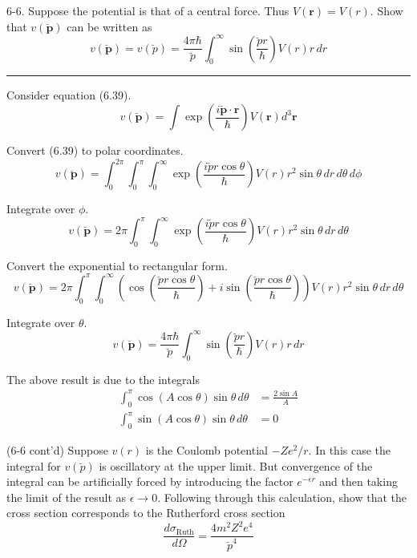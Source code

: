 \documentclass[12pt]{article}
\begin{document}
6-6.
Suppose the potential is that of a central force.
Thus $V(\mathbf r)=V(r)$.
Show that $v(\breve{\mathbf p})$ can be written as
\begin{equation*}
v(\breve{\mathbf p})=v(\breve p)=\frac{4\pi\hbar}{\breve p}
\int_0^\infty\sin\left(\frac{\breve pr}{\hbar}\right)V(r)r\,dr
\tag{6.45}
\end{equation*}

\bigskip
\hrule

\bigskip
Consider equation (6.39).
\begin{equation*}
v(\breve{\mathbf p})=\int\exp\left(\frac{i\breve{\mathbf p}\cdot\mathbf r}{\hbar}\right)
V(\mathbf r)d^3\mathbf r
\tag{6.39}
\end{equation*}

Convert (6.39) to polar coordinates.
\begin{equation*}
v(\breve{\mathbf p})=\int_0^{2\pi}\int_0^\pi\int_0^\infty
\exp\left(\frac{i\breve pr\cos\theta}{\hbar}\right)
V(r)r^2\sin\theta\,dr\,d\theta\,d\phi
\end{equation*}

Integrate over $\phi$.
\begin{equation*}
v(\breve{\mathbf p})=2\pi\int_0^\pi\int_0^\infty
\exp\left(\frac{i\breve pr\cos\theta}{\hbar}\right)
V(r)r^2\sin\theta\,dr\,d\theta
\end{equation*}

Convert the exponential to rectangular form.
\begin{equation*}
v(\breve{\mathbf p})=2\pi\int_0^\pi\int_0^\infty
\left(\cos\left(\frac{\breve pr\cos\theta}{\hbar}\right)
+i\sin\left(\frac{\breve pr\cos\theta}{\hbar}\right)\right)
V(r)r^2\sin\theta\,dr\,d\theta
\end{equation*}

Integrate over $\theta$.
\begin{equation*}
v(\breve{\mathbf p})=\frac{4\pi\hbar}{\breve p}\int_0^\infty
\sin\left(\frac{\breve pr}{\hbar}\right)
V(r)r\,dr
\end{equation*}

The above result is due to the integrals
\begin{align*}
\int_0^\pi\cos(A\cos\theta)\sin\theta\,d\theta&=\frac{2\sin A}{A}
\\
\int_0^\pi\sin(A\cos\theta)\sin\theta\,d\theta&=0
\end{align*}

(6-6 cont'd)
Suppose $v(r)$ is the Coulomb potential $-Ze^2/r$.
In this case the integral for $v(\breve p)$ is oscillatory at the upper limit.
But convergence of the integral can be artificially forced by
introducing the factor $e^{-\epsilon r}$ and then taking the limit
of the result as $\epsilon\rightarrow0$.
Following through this calculation,
show that the cross section corresponds to the Rutherford cross section
\begin{equation*}
\frac{d\sigma_\text{Ruth}}{d\Omega}
=\frac{4m^2Z^2e^4}{\breve p^4}
\tag{6.46}
\end{equation*}
\end{document}
